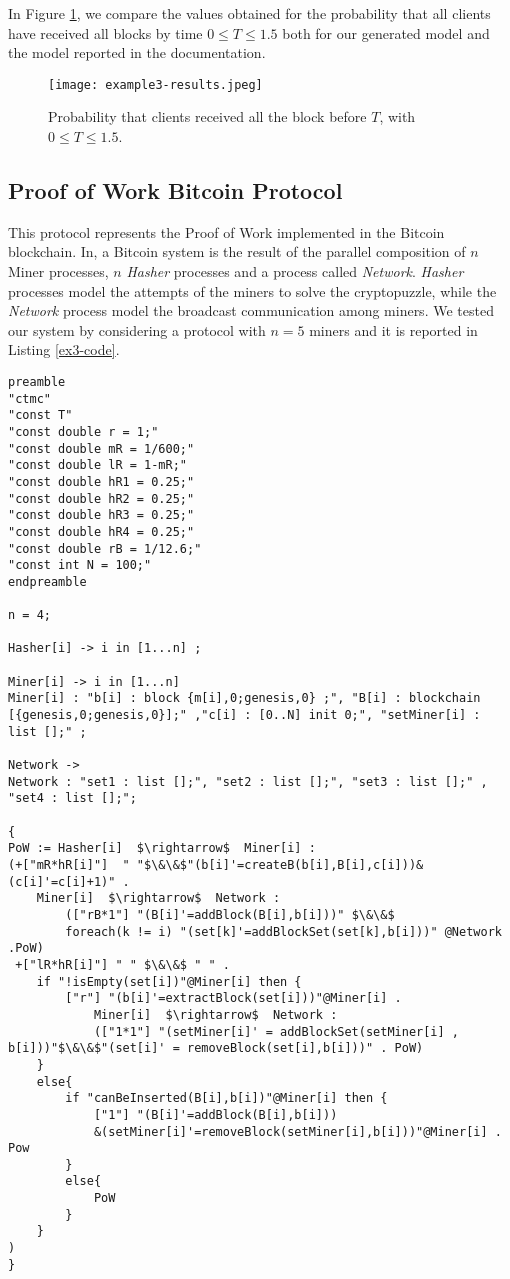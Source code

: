 In Figure \ref{ex2-res}, we compare the values obtained for the probability that all clients have received all blocks by time $0\leq T\leq 1.5$ both for our generated model and the model reported in the documentation.
\begin{figure}[h]
\centering
\texttt{[image: example3-results.jpeg]}	
\caption{Probability that clients received all the block before $T$, with $0\leq T \leq 1.5$.}
\label{ex2-res}
\end{figure}

\subsection{Proof of Work Bitcoin Protocol}
This protocol represents the Proof of Work implemented in the Bitcoin blockchain.
In\cite{DBLP:journals/concurrency/BistarelliNGLMV23}, a Bitcoin system is the result of the parallel composition of $n$ Miner processes, $n$  \emph{Hasher} processes and a process called \emph{Network}.
\emph{Hasher} processes model the attempts of the miners to solve the cryptopuzzle, while the \emph{Network} process model the broadcast communication among miners. 
We tested our system by considering a protocol with $n=5$ miners and it is reported in Listing \ref{ex3-code}.
\begin{lstlisting}[style=chor-color,caption={Choreographic language for the Proof of Work Bitcoin Protocol.},captionpos=b,label={ex3-code}]
preamble
"ctmc"
"const T"
"const double r = 1;"
"const double mR = 1/600;"
"const double lR = 1-mR;"
"const double hR1 = 0.25;"
"const double hR2 = 0.25;"
"const double hR3 = 0.25;"
"const double hR4 = 0.25;"
"const double rB = 1/12.6;"
"const int N = 100;"
endpreamble

n = 4;

Hasher[i] -> i in [1...n] ;

Miner[i] -> i in [1...n]
Miner[i] : "b[i] : block {m[i],0;genesis,0} ;", "B[i] : blockchain [{genesis,0;genesis,0}];" ,"c[i] : [0..N] init 0;", "setMiner[i] : list [];" ;

Network ->
Network : "set1 : list [];", "set2 : list [];", "set3 : list [];" , "set4 : list [];"; 
	
{
PoW := Hasher[i]  $\rightarrow$  Miner[i] :
(+["mR*hR[i]"]  " "$\&\&$"(b[i]'=createB(b[i],B[i],c[i]))&(c[i]'=c[i]+1)" . 
	Miner[i]  $\rightarrow$  Network : 
		(["rB*1"] "(B[i]'=addBlock(B[i],b[i]))" $\&\&$ 
		foreach(k != i) "(set[k]'=addBlockSet(set[k],b[i]))" @Network .PoW)
 +["lR*hR[i]"] " " $\&\&$ " " .
 	if "!isEmpty(set[i])"@Miner[i] then { 
  		["r"] "(b[i]'=extractBlock(set[i]))"@Miner[i] . 
			Miner[i]  $\rightarrow$  Network : 
			(["1*1"] "(setMiner[i]' = addBlockSet(setMiner[i] , b[i]))"$\&\&$"(set[i]' = removeBlock(set[i],b[i]))" . PoW) 
 	}
 	else{
 		if "canBeInserted(B[i],b[i])"@Miner[i] then { 
 			["1"] "(B[i]'=addBlock(B[i],b[i]))
			&(setMiner[i]'=removeBlock(setMiner[i],b[i]))"@Miner[i] . Pow 
 		}
 		else{
 			PoW
		}
	}
)
} 	
\end{lstlisting}

